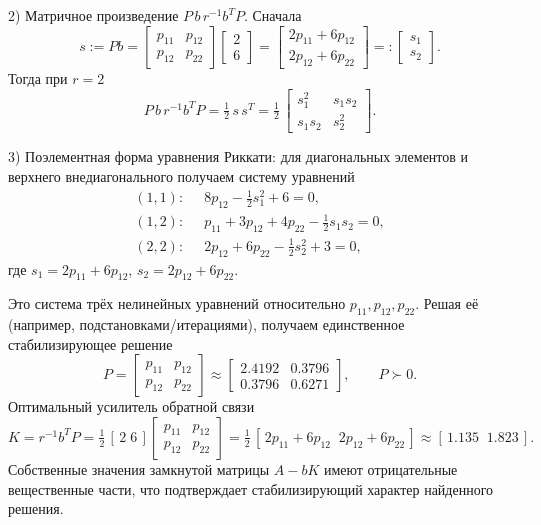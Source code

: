 2) Матричное произведение \(P\,b\,r^{-1}b^T P\). Сначала
\[
 s := P b = \begin{bmatrix}p_{11}&p_{12}\\p_{12}&p_{22}\end{bmatrix}\!\begin{bmatrix}2\\6\end{bmatrix} = \begin{bmatrix}2p_{11}+6p_{12}\\ 2p_{12}+6p_{22}\end{bmatrix} =: \begin{bmatrix}s_1\\ s_2\end{bmatrix}.
\]
Тогда при \(r=2\)
\[
 P\,b\,r^{-1}b^T P = \tfrac{1}{2}\, s\,s^T = \tfrac{1}{2}\,\begin{bmatrix}s_1^2 & s_1 s_2\\ s_1 s_2 & s_2^2\end{bmatrix}.
\]

3) Поэлементная форма уравнения Риккати: для диагональных элементов и верхнего внедиагонального получаем систему уравнений
\begin{align}
 (1,1):\;&\; 8p_{12} - \tfrac{1}{2}s_1^2 + 6 = 0,\\
 (1,2):\;&\; p_{11}+3p_{12}+4p_{22} - \tfrac{1}{2}s_1 s_2 = 0,\\
 (2,2):\;&\; 2p_{12}+6p_{22} - \tfrac{1}{2}s_2^2 + 3 = 0,
\end{align}
где \(s_1=2p_{11}+6p_{12}\), \(s_2=2p_{12}+6p_{22}\).

Это система трёх нелинейных уравнений относительно \(p_{11},p_{12},p_{22}\). Решая её (например, подстановками/итерациями), получаем единственное стабилизирующее решение
\[
 P = \begin{bmatrix}p_{11}&p_{12}\\p_{12}&p_{22}\end{bmatrix} \approx \begin{bmatrix}2.4192 & 0.3796\\ 0.3796 & 0.6271\end{bmatrix},\qquad P\succ0.
\]
Оптимальный усилитель обратной связи
\[
 K = r^{-1} b^T P = \tfrac{1}{2}\,[\,2\;6\,] \begin{bmatrix}p_{11}&p_{12}\\p_{12}&p_{22}\end{bmatrix} = \tfrac{1}{2}\,[\,2p_{11}+6p_{12}\;\;2p_{12}+6p_{22}\,] \approx [\,1.135\;\;1.823\,].
\]
Собственные значения замкнутой матрицы \(A-bK\) имеют отрицательные вещественные части, что подтверждает стабилизирующий характер найденного решения.

